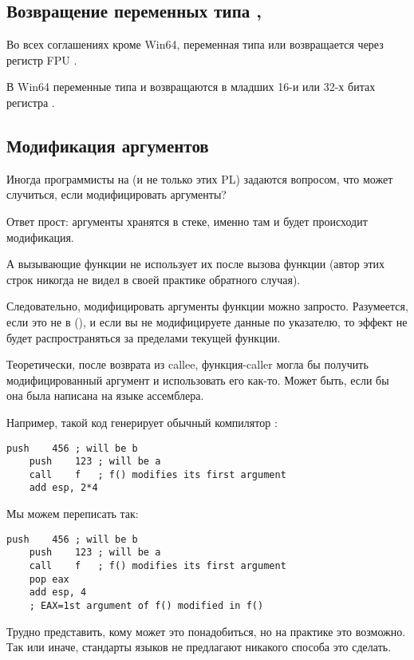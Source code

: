 \subsection{Возвращение переменных типа \Tfloat, \Tdouble}

Во всех соглашениях кроме Win64, переменная типа \Tfloat или \Tdouble возвращается через регистр FPU .

В Win64 переменные типа \Tfloat и \Tdouble возвращаются в младших 16-и или 32-х битах 
регистра .

\subsection{Модификация аргументов}

Иногда программисты на \CCpp{} (и не только этих \ac{PL}) задаются вопросом,
что может случиться, если модифицировать аргументы?

Ответ прост: аргументы хранятся в стеке, именно там и будет происходит модификация.

А вызывающие функции не использует их после вызова функции (автор этих строк никогда не видел в своей практике обратного случая).






Следовательно, модифицировать аргументы функции можно запросто.
Разумеется, если это не  в \Cpp{} (),
и если вы не модифицируете данные по указателю, 
то эффект не будет распространяться за пределами текущей функции.

Теоретически, после возврата из \gls{callee},
функция-\gls{caller} могла бы получить модифицированный аргумент и использовать его как-то.
Может быть, если бы она была написана на языке ассемблера.

Например, такой код генерирует обычный компилятор \CCpp:

\begin{lstlisting}[style=customasmx86]
	push	456	; will be b
	push	123	; will be a
	call	f	; f() modifies its first argument
	add	esp, 2*4
\end{lstlisting}

Мы можем переписать так:

\begin{lstlisting}[style=customasmx86]
	push	456	; will be b
	push	123	; will be a
	call	f	; f() modifies its first argument
	pop	eax
	add	esp, 4
	; EAX=1st argument of f() modified in f()
\end{lstlisting}

Трудно представить, кому может это понадобиться, но на практике это возможно.
Так или иначе, стандарты языков \CCpp не предлагают никакого способа это сделать.



